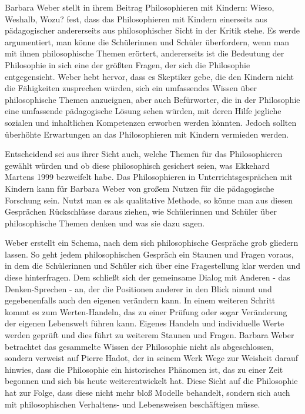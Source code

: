 Barbara Weber stellt in ihrem Beitrag \glqq Philosophieren mit Kindern: Wieso, Weshalb, Wozu?\grqq{} fest, dass das Philosophieren mit Kindern einerseits aus pädagogischer andererseits aus philosophischer Sicht in der Kritik stehe. 
Es werde argumentiert, man könne die Schülerinnen und Schüler überfordern, wenn man mit ihnen philosophische Themen erörtert, andererseits ist die Bedeutung der Philosophie in sich eine der größten Fragen, der sich die Philosophie entgegensieht. 
Weber hebt hervor, dass es Skeptiker gebe, die den Kindern nicht die Fähigkeiten zusprechen würden, sich ein umfassendes Wissen über philosophische Themen anzueignen, aber auch Befürworter, die in der Philosophie eine umfassende pädagogische Lösung sehen würden, mit deren Hilfe jegliche sozialen und inhaltlichen Kompetenzen erworben werden könnten\cite[S.\,623]{BW13}.
Jedoch sollten überhöhte Erwartungen an das Philosophieren mit Kindern vermieden werden. 

Entscheidend sei aus ihrer Sicht auch, welche Themen für das Philosophieren gewählt würden und ob diese philosophisch gesichert seien, was Ekkehard Martens 1999 bezweifelt habe\cite[S.\,624]{BW13}. 
Das Philosophieren in Unterrichtsgesprächen mit Kindern kann für Barbara Weber von großem Nutzen für die pädagogische Forschung sein. 
Nutzt man es als qualitative Methode, so könne man aus diesen Gesprächen Rückschlüsse daraus ziehen, wie Schülerinnen und Schüler über philosophische Themen denken und was sie dazu sagen.

Weber erstellt ein Schema, nach dem sich philosophische Gespräche grob gliedern lassen. 
So geht jedem philosophischen Gespräch ein Staunen und Fragen voraus, in dem die Schülerinnen und Schüler sich über eine Fragestellung klar werden und diese hinterfragen. 
Dem schließt sich der gemeinsame Dialog mit Anderen - das Denken-Sprechen - an, der die Positionen anderer in den Blick nimmt und gegebenenfalls auch den eigenen verändern kann. 
In einem weiteren Schritt kommt es zum Werten-Handeln, das zu einer Prüfung oder sogar Veränderung der eigenen Lebenswelt führen kann. 
Eigenes Handeln und individuelle Werte werden geprüft und dies führt zu weiterem Staunen und Fragen\cite[S.\,626]{BW13}.
Barbara Weber betrachtet das gesammelte Wissen der Philosophie nicht als abgeschlossen, sondern verweist auf Pierre Hadot, der in seinem Werk \glqq Wege zur Weisheit\grqq{} darauf hinwies, dass \glqq die Philosophie ein historisches Phänomen ist, das zu einer Zeit begonnen und sich bis heute weiterentwickelt hat.\grqq{}
Diese Sicht auf die Philosophie hat zur Folge, dass diese nicht mehr bloß Modelle behandelt, sondern sich auch mit philosophischen Verhaltens- und Lebensweisen beschäftigen müsse.

